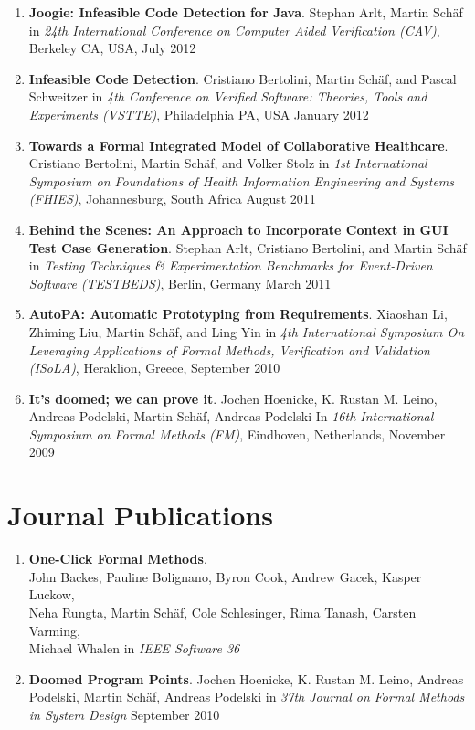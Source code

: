 \begin{enumerate}
\item \textbf{Joogie: Infeasible Code Detection for Java}. Stephan Arlt, Martin
Sch\"af in \emph{24th International Conference on Computer Aided Verification
(CAV)}, Berkeley CA, USA, July 2012

\item \textbf{Infeasible Code Detection}. Cristiano Bertolini, Martin
Sch\"af, and Pascal Schweitzer in \emph{4th Conference on Verified Software:
Theories, Tools and Experiments (VSTTE)}, Philadelphia PA, USA January 2012

\item \textbf{Towards a Formal Integrated Model of Collaborative Healthcare}.
Cristiano Bertolini, Martin Sch\"af, and Volker Stolz  in \emph{1st International Symposium on 
Foundations of Health Information Engineering and Systems (FHIES)}, Johannesburg, South Africa
August 2011

\item \textbf{Behind the Scenes: An Approach to Incorporate Context in GUI Test
Case Generation}. Stephan Arlt, Cristiano Bertolini, and Martin Sch\"af  in \emph{Testing Techniques \& Experimentation Benchmarks
for Event-Driven Software (TESTBEDS)}, Berlin, Germany
March 2011

\item \textbf{AutoPA: Automatic Prototyping from Requirements}. Xiaoshan Li,
Zhiming Liu, Martin Sch\"af, and Ling Yin in \emph{4th International Symposium On Leveraging Applications of Formal Methods, Verification and Validation (ISoLA)}, Heraklion, Greece,
September 2010

\item \textbf{It's doomed; we can prove it}. Jochen Hoenicke, K. Rustan M.
Leino, Andreas Podelski, Martin Sch\"af, Andreas Podelski In
\emph{16th International Symposium on Formal Methods (FM)}, Eindhoven, Netherlands,
November 2009
  
\setcounter{saveenum}{\value{enumi}}
\end{enumerate}



\section{\sc Journal Publications}

\begin{enumerate} \setcounter{enumi}{\value{saveenum}}

\item \textbf{One-Click Formal Methods}.
\\ John Backes, Pauline Bolignano, Byron Cook, Andrew Gacek, Kasper Luckow, \\
Neha Rungta, Martin Sch\"af, Cole Schlesinger, Rima Tanash, Carsten Varming, \\
Michael Whalen in 
\emph{IEEE Software 36}

\item  \textbf{Doomed Program Points}. Jochen Hoenicke, K. Rustan M. Leino,
Andreas Podelski, Martin Sch\"af, Andreas Podelski in
\emph{37th Journal on Formal Methods in System Design}
September 2010

\setcounter{saveenum}{\value{enumi}}
\end{enumerate}


